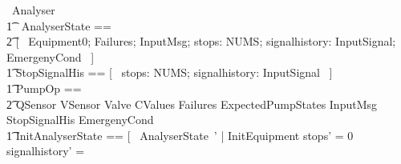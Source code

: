 \documentclass{report} %
\begin{document}
\begin{circus}
   \circprocess\ Analyser \circdef\ \circbegin \\
   \t1 \circstate\ AnalyserState == \\ \t2 [~ Equipment0; Failures; InputMsg; stops: NUMS; signalhistory: \power InputSignal; EmergenyCond ~] \\
    \t1 StopSignalHis == [~ stops: NUMS; signalhistory: \power InputSignal ~] \\ %
    \t1 PumpOp == \\ \t2 \Xi QSensor \land \Xi VSensor \land \Xi Valve \land \Xi CValues \land \Xi Failures \land \Xi ExpectedPumpStates \land \Xi InputMsg \land \Xi StopSignalHis \land \Xi EmergenyCond \\ %
    \t1 InitAnalyserState == [~ AnalyserState~' | InitEquipment \land stops' = 0 \land signalhistory' = \emptyset \land \\

\end{circus}
\end{document}
